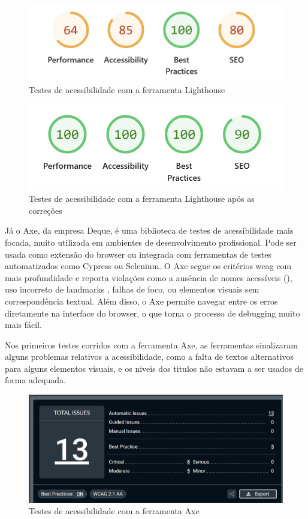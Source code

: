 \begin{figure}[H]
\centering
\includegraphics[width=\textwidth]{./img/lh_before}
\caption{Testes de acessibilidade com a ferramenta Lighthouse}
\end{figure}

\begin{figure}[H]
\centering
\includegraphics[width=\textwidth]{./img/lh_after}
\caption{Testes de acessibilidade com a ferramenta Lighthouse após as correções}
\end{figure}

Já o Axe, da empresa Deque, é uma biblioteca de testes de acessibilidade mais focada, muito utilizada em ambientes de desenvolvimento profissional. Pode ser usada como extensão do browser ou integrada com ferramentas de testes automatizados como Cypress ou Selenium. O Axe segue os critérios \gls{wcag} com mais profundidade e reporta violações como a ausência de nomes acessíveis (), uso incorreto de landmarks , falhas de foco, ou elementos visuais sem correspondência textual. Além disso, o Axe permite navegar entre os erros diretamente na interface do browser, o que torna o processo de debugging muito mais fácil.

Nos primeiros testes corridos com a ferramenta Axe, as ferramentas sinalizaram alguns problemas relativos a acessibilidade, como a falta de textos alternativos para alguns elementos visuais, e os niveis dos titulos não estavam a ser usados de forma adequada.

\begin{figure}[H]
    \centering
    \includegraphics[width=\textwidth]{./img/axe}
    \caption{Testes de acessibilidade com a ferramenta Axe}
    \end{figure}


